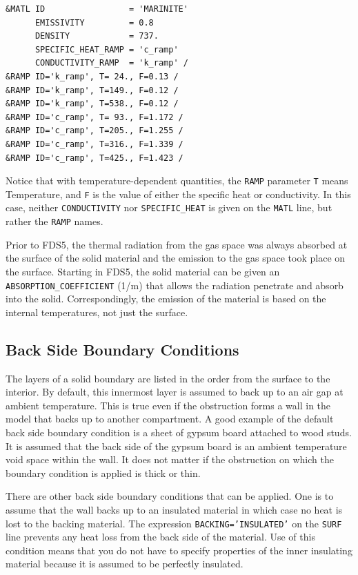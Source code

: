 \documentclass[11pt]{book}
\newcommand{\ct}{\tt\small}
\begin{document}
\footnotesize
\begin{verbatim}
&MATL ID                 = 'MARINITE'
      EMISSIVITY         = 0.8
      DENSITY            = 737.
      SPECIFIC_HEAT_RAMP = 'c_ramp'
      CONDUCTIVITY_RAMP  = 'k_ramp' /
&RAMP ID='k_ramp', T= 24., F=0.13 /
&RAMP ID='k_ramp', T=149., F=0.12 /
&RAMP ID='k_ramp', T=538., F=0.12 /
&RAMP ID='c_ramp', T= 93., F=1.172 /
&RAMP ID='c_ramp', T=205., F=1.255 /
&RAMP ID='c_ramp', T=316., F=1.339 /
&RAMP ID='c_ramp', T=425., F=1.423 /
\end{verbatim}
\normalsize
Notice that with temperature-dependent quantities, the {\ct RAMP} parameter
{\ct T} means Temperature, and {\ct F} is the value of either
the specific heat or conductivity. In this case, neither {\ct CONDUCTIVITY} nor {\ct SPECIFIC\_HEAT} is given on the
{\ct MATL} line, but rather the {\ct RAMP} names.

Prior to FDS5, the thermal radiation from the gas space was always
absorbed at the surface of the solid material and the emission to the
gas space took place on the surface. Starting in FDS5, the solid
material can be given an {\ct ABSORPTION\_COEFFICIENT} (1/m) that allows
the radiation penetrate and absorb into the solid. Correspondingly,
the emission of the material is based on the internal temperatures,
not just the surface.




\subsection{Back Side Boundary Conditions}
\label{info:BACKING}

The layers of a solid boundary are listed in the order from the surface to the interior. By default,
this innermost layer is assumed to back up to an air gap at ambient
temperature. This is true even if the obstruction forms a wall in the model that backs up to another
compartment. A good example of the default back side boundary condition is a sheet of gypsum board attached to wood studs.
It is assumed that the back side of the gypsum board is an ambient temperature void space within the wall. It does not
matter if the obstruction on which the boundary condition is applied is thick or thin.

There are other back side boundary conditions that can be applied. One is to assume that the wall
backs up to an insulated material in which case no heat is lost to
the backing material. The expression {\ct BACKING='INSULATED'} on
the {\ct SURF} line prevents any heat loss from the back side of the material. Use of this condition
means that you  do not have to specify properties of the inner insulating material because it is assumed to
be perfectly insulated.
\end{document}
